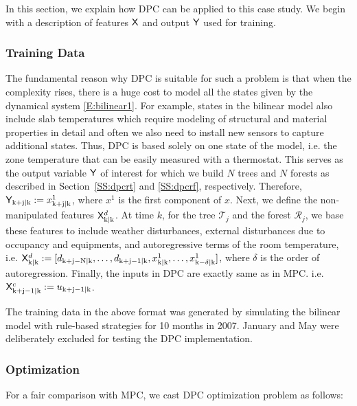 In this section, we explain how DPC can be applied to this case study. We begin with a description of features $\mathsf{X}$ and output $\mathsf{Y}$ used for training.

\subsubsection{Training Data} 
\label{SSS:dpc_data}

The fundamental reason why DPC  is suitable for such a problem is that when the complexity rises, there is a huge cost to model all the states given by the dynamical system \eqref{E:bilinear1}. For example, states in the bilinear model also include slab temperatures which require modeling of structural and material properties in detail and often we also need to install new sensors to capture additional states. Thus, DPC is based solely on one state of the model, i.e. the zone temperature that can be easily measured with a thermostat. This serves as the output variable $\mathsf{Y}$ of interest for which we build $N$ trees and $N$ forests as described in Section~\ref{SS:dpcrt} and \ref{SS:dpcrf}, respectively. Therefore, $\mathsf{Y}_{\mathrm{k+j|k}}:=x_{\mathrm{k+j|k}}^1$, where $x^1$ is the first component of $x$.
Next, we define the non-manipulated features $\mathsf{X}^d_{\mathrm{k|k}}$. At time $k$, for the tree $\mathcal{T}_j$ and the forest $\mathcal{R}_j$, we base these features to include weather disturbances, external disturbances due to occupancy and equipments, and autoregressive terms of the room temperature, i.e.
$\mathsf{X}^d_{\mathrm{k|k}}:=[ d_{\mathrm{k+j-N|k}} ,\dots,d_{\mathrm{k+j-1|k}}, x_{\mathrm{k|k}}^1,\dots, x_{\mathrm{k-\delta|k}}^1 ]$, where $\delta$ is the order of autoregression.
Finally, the inputs in DPC are exactly same as in MPC. i.e. $\mathsf{X}^c_{\mathrm{k+j-1|k}}:=u_{\mathrm{k+j-1|k}}$.

The training data in the above format was generated by simulating the bilinear model with rule-based strategies for 10 months in 2007. January and May were deliberately excluded for testing the DPC implementation.

\subsubsection{Optimization} 
\label{SSS:dpc_opt}
For a fair comparison with MPC, we cast DPC optimization problem as follows:

